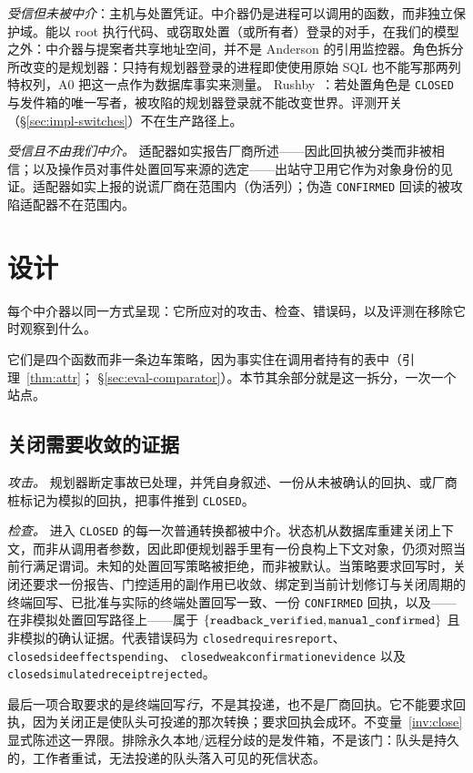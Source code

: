 \documentclass[acmsmall,manuscript,review,anonymous]{acmart}
\renewcommand{\_}{\discretionary{\textunderscore}{}{\textunderscore}}
\begin{document}
\emph{受信但未被中介}：主机与处置凭证。中介器仍是进程可以调用的函数，而非独立保护域。能以 root 执行代码、或窃取处置（或所有者）登录的对手，在我们的模型之外：中介器与提案者共享地址空间，并不是 Anderson 的引用监控器。角色拆分所改变的是规划器：只持有规划器登录的进程即使使用原始 {SQL} 也不能写那两列特权列，A0 把这一点作为数据库事实来测量。
Rushby~\cite{rushby1981design}：若处置角色是 \texttt{CLOSED} 与发件箱的唯一写者，被攻陷的规划器登录就不能改变世界。评测开关
（\S\ref{sec:impl-switches}）不在生产路径上。

\emph{受信且不由我们中介。} 适配器如实报告厂商所述——因此回执被分类而非被相信；以及操作员对事件处置回写来源的选定——出站守卫用它作为对象身份的见证。适配器如实上报的说谎厂商在范围内（伪活列）；伪造 \texttt{CONFIRMED} 回读的被攻陷适配器不在范围内。

\section{设计}
\label{sec:design}

每个中介器以同一方式呈现：它所应对的攻击、检查、错误码，以及评测在移除它时观察到什么。

它们是四个函数而非一条边车策略，因为事实住在调用者持有的表中（引理~\ref{thm:attr}；
\S\ref{sec:eval-comparator}）。本节其余部分就是这一拆分，一次一个站点。

\subsection{关闭需要收敛的证据}
\label{sec:design-close}

\emph{攻击。} 规划器断定事故已处理，并凭自身叙述、一份从未被确认的回执、或厂商桩标记为模拟的回执，把事件推到 \texttt{CLOSED}。

\emph{检查。} 进入 \texttt{CLOSED} 的每一次普通转换都被中介。状态机从数据库重建关闭上下文，而非从调用者参数，因此即便规划器手里有一份良构上下文对象，仍须对照当前行满足谓词。未知的处置回写策略被拒绝，而非被默认。当策略要求回写时，关闭还要求一份报告、门控适用的副作用已收敛、绑定到当前计划修订与关闭周期的终端回写、已批准与实际的终端处置回写一致、一份 \texttt{CONFIRMED} 回执，以及——在非模拟处置回写路径上——属于 $\{\texttt{readback\_verified}, \texttt{manual\_confirmed}\}$ 且非模拟的确认证据。代表错误码为
\texttt{closed\_requires\_report}、
\texttt{closed\_side\_effects\_pending}、
\texttt{closed\_weak\_confirmation\_evidence} 以及
\texttt{closed\_simulated\_receipt\_rejected}。

最后一项合取要求的是终端回写\emph{行}，不是其投递，也不是厂商回执。它不能要求回执，因为关闭正是使队头可投递的那次转换；要求回执会成环。不变量~\ref{inv:close} 显式陈述这一界限。排除永久本地/远程分歧的是发件箱，不是该门：队头是持久的，工作者重试，无法投递的队头落入可见的死信状态。
\end{document}
